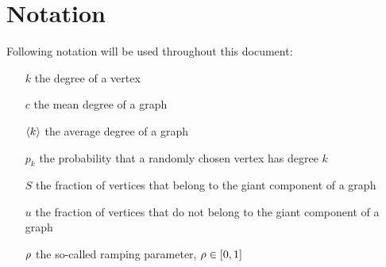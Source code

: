 \chapter*{Notation} %
\label{cha:notation}

Following notation will be used throughout this document:
\begin{itemize}
	\item[$k$] the degree of a vertex
	\item[$c$] the mean degree of a graph
	\item[$\left< k \right>$] the average degree of a graph
	\item[$p_k$] the probability that a randomly chosen vertex has degree $k$
	\item[$S$] the fraction of vertices that belong to the giant component of a graph
	\item[$u$] the fraction of vertices that do not belong to the giant component of a graph
	\item[$\rho$] the so-called ramping parameter, $\rho \in [0,1]$
\end{itemize}
